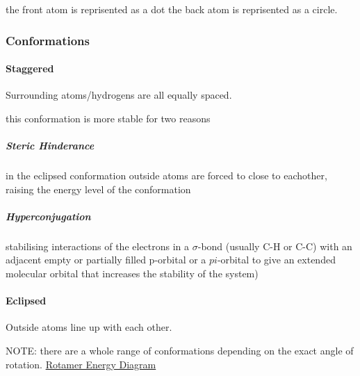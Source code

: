 \documentclass[]{article}
\let\oldparagraph\paragraph
\renewcommand{\paragraph}[1]{\oldparagraph{#1}\mbox{}}
\let\oldsubparagraph\subparagraph
\renewcommand{\subparagraph}[1]{\oldsubparagraph{#1}\mbox{}}
\begin{document}
the front atom is reprisented as a dot the back atom is reprisented as a
circle.

\hypertarget{conformations}{%
\subsubsection{Conformations}\label{conformations}}

\hypertarget{staggered}{%
\paragraph{Staggered}\label{staggered}}

Surrounding atoms/hydrogens are all equally spaced.

this conformation is more stable for two reasons

\hypertarget{steric-hinderance}{%
\subparagraph{Steric Hinderance}\label{steric-hinderance}}

in the eclipsed conformation outside atoms are forced to close to
eachother, raising the energy level of the conformation

\hypertarget{hyperconjugation}{%
\subparagraph{Hyperconjugation}\label{hyperconjugation}}

stabilising interactions of the electrons in a \(\sigma\)-bond (usually
C-H or C-C) with an adjacent empty or partially filled p-orbital or a
\(pi\)-orbital to give an extended molecular orbital that increases the
stability of the system)

\hypertarget{eclipsed}{%
\paragraph{Eclipsed}\label{eclipsed}}

Outside atoms line up with each other.

NOTE: there are a whole range of conformations depending on the exact
angle of rotation. \href{Images/RotamerEnergyDiagram.jpg}{Rotamer Energy
Diagram}
\end{document}
